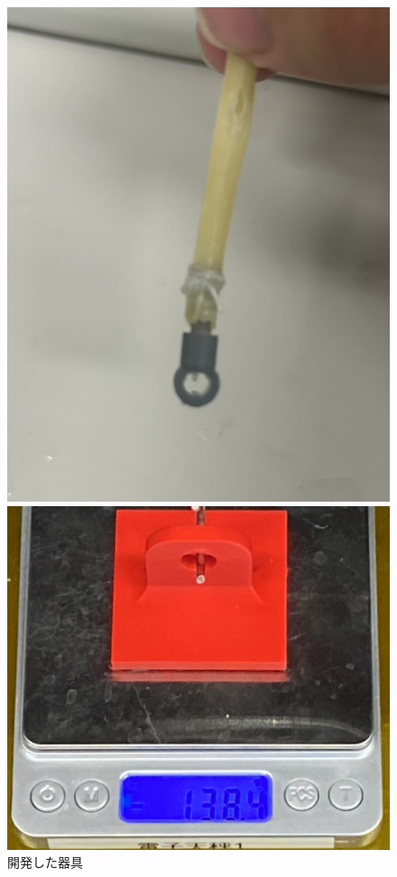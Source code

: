 \begin{figure}[h]
  \begin{minipage}{0.49\columnwidth}
    \vspace{4mm}
    \centering
    \includegraphics[scale=0.2]{pic/gg.jpg}
    \caption{開発した器具}
    \label{fig:new}
  \end{minipage}
  \begin{minipage}{0.49\columnwidth}
    \vspace{4mm}
    \centering
    \includegraphics[scale=0.1]{pic/qqqq.jpg}

\end{minipage}
\end{figure}
